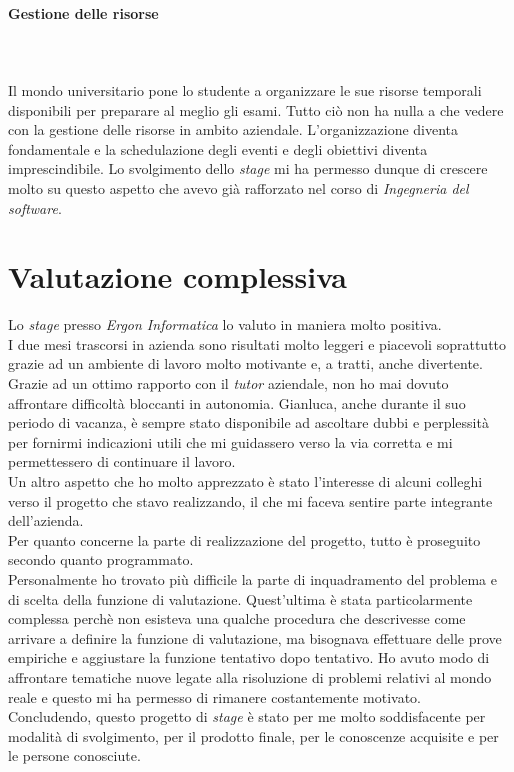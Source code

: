 \paragraph{Gestione delle risorse}\hfill\\\\
Il mondo universitario pone lo studente a organizzare le sue risorse temporali disponibili
per preparare al meglio gli esami. Tutto ciò non ha nulla a che vedere con la
gestione delle risorse in ambito aziendale. L'organizzazione diventa fondamentale
e la schedulazione degli eventi e degli obiettivi diventa imprescindibile.
Lo svolgimento dello \textit{stage} mi ha permesso dunque di crescere molto su questo aspetto
che avevo già rafforzato nel corso di \textit{Ingegneria del software}.

\section{Valutazione complessiva}
\noindent Lo \textit{stage} presso \textit{Ergon Informatica} lo valuto in maniera molto positiva.\\
I due mesi trascorsi in azienda sono risultati molto leggeri e piacevoli soprattutto grazie
ad un ambiente di lavoro molto motivante e, a tratti, anche divertente.\\

\noindent Grazie ad un ottimo rapporto con il \textit{\textit{tutor}} aziendale, non ho mai dovuto
affrontare difficoltà bloccanti in autonomia. Gianluca, anche durante il suo periodo di vacanza, è sempre stato disponibile
ad ascoltare dubbi e perplessità per fornirmi indicazioni utili che mi guidassero
verso la via corretta e mi permettessero di continuare il lavoro.\\
Un altro aspetto che ho molto apprezzato è stato l'interesse di alcuni colleghi
verso il progetto che stavo realizzando, il che mi faceva sentire parte integrante
dell'azienda.\\

\noindent Per quanto concerne la parte di realizzazione del progetto, tutto è proseguito secondo quanto programmato.\\
Personalmente ho trovato più difficile la parte di inquadramento del problema e di scelta della funzione di valutazione.
Quest'ultima è stata particolarmente complessa perchè non esisteva una qualche procedura
che descrivesse come arrivare a definire la funzione di valutazione, ma bisognava
effettuare delle prove empiriche e aggiustare la funzione tentativo dopo tentativo.
Ho avuto modo di affrontare tematiche nuove legate alla risoluzione di problemi
relativi al mondo reale e questo mi ha permesso di rimanere costantemente motivato.\\

\noindent Concludendo, questo progetto di \textit{stage} è stato per me
molto soddisfacente per modalità di svolgimento, per il prodotto finale, per le conoscenze acquisite e per le persone conosciute.